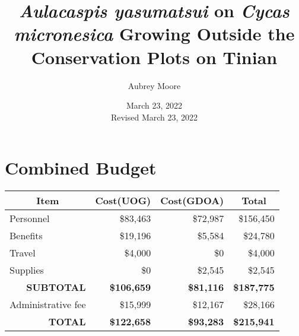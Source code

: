 \documentclass[12pt,letterpaper,english,bibliography=totocnumbered, abstract=on]{scrartcl}
\begin{document}
\titlehead{Technical Report}

\title{\textit{Aulacaspis yasumatsui} on \textit{Cycas micronesica} Growing Outside the Conservation Plots on Tinian}

\author{Aubrey Moore}

\date{March 23, 2022\\Revised March 23, 2022}

\maketitle
\newpage
\tableofcontents

\pagebreak

\section{Combined Budget}

\begin{table}[h]
	\centering
	\begin{tabular}{@{}lrrr@{}}
		\toprule
		\multicolumn{1}{c}{\textbf{Item}} & \multicolumn{1}{c}{\textbf{Cost(UOG)}} & \multicolumn{1}{c}{\textbf{Cost(GDOA)}} & \multicolumn{1}{c}{\textbf{Total}} \\ 
		\midrule
		Personnel & \$83,463 & \$72,987 & \$156,450 \\
		Benefits  & \$19,196 & \$5,584 & \$24,780 \\
		Travel & \$4,000 & \$0 & \$4,000 \\
		Supplies & \$0 & \$2,545 & \$2,545 \\ 
		\midrule
		\multicolumn{1}{r}{\textbf{SUBTOTAL}} & \textbf{\$106,659} & \textbf{\$81,116} & \textbf{\$187,775} \\ \midrule
		Administrative fee & \$15,999 & \$12,167 & \$28,166 \\ \midrule
		\multicolumn{1}{r}{\textbf{TOTAL}} & \textbf{\$122,658} & \textbf{\$93,283} & \textbf{\$215,941} \\ \bottomrule
	\end{tabular}
\end{table}
\end{document}
